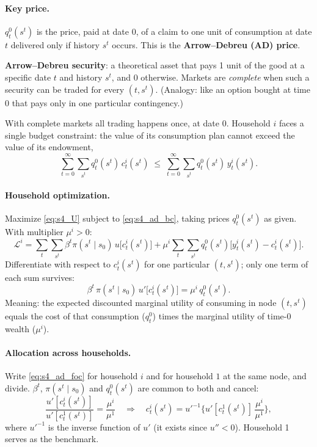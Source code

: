 \paragraph{Key price.} $q^0_t(s^t)$ is the price, paid at date $0$, of a claim to one unit of consumption at date $t$ delivered only if history $s^t$ occurs. This is the \textbf{Arrow--Debreu (AD) price}.

\textbf{Arrow--Debreu security}: a theoretical asset that pays 1 unit of the good at a specific date $t$ and history $s^t$, and 0 otherwise. Markets are \emph{complete} when such a security can be traded for every $(t,s^t)$. (Analogy: like an option bought at time 0 that pays only in one particular contingency.)

With complete markets all trading happens once, at date $0$. Household $i$ faces a single budget constraint: the value of its consumption plan cannot exceed the value of its endowment,
\begin{equation}\label{eq:s4_ad_bc}
  \sum_{t=0}^{\infty}\sum_{s^t} q^0_t(s^t)\,c^i_t(s^t) \;\le\; \sum_{t=0}^{\infty}\sum_{s^t} q^0_t(s^t)\,y^i_t(s^t).
\end{equation}

\paragraph{Household optimization.} Maximize \eqref{eq:s4_U} subject to \eqref{eq:s4_ad_bc}, taking prices $q^0_t(s^t)$ as given. With multiplier $\mu^i>0$:
\[
\mathcal L^i = \sum_{t}\sum_{s^t}\beta^t\pi(s^t\mid s_0)\,u\big[c^i_t(s^t)\big]
 + \mu^i\sum_{t}\sum_{s^t}q^0_t(s^t)\big[y^i_t(s^t)-c^i_t(s^t)\big].
\]
Differentiate with respect to $c^i_t(s^t)$ for one particular $(t,s^t)$; only one term of each sum survives:
\begin{equation}\label{eq:s4_ad_foc}
  \beta^t\,\pi(s^t\mid s_0)\,u'\big[c^i_t(s^t)\big] = \mu^i\, q^0_t(s^t).
\end{equation}
Meaning: the expected discounted marginal utility of consuming in node $(t,s^t)$ equals the cost of that consumption ($q^0_t$) times the marginal utility of time-0 wealth ($\mu^i$).

\paragraph{Allocation across households.}
Write \eqref{eq:s4_ad_foc} for household $i$ and for household $1$ at the same node, and divide. $\beta^t$, $\pi(s^t\mid s_0)$ and $q^0_t(s^t)$ are common to both and cancel:
\begin{equation}\label{eq:s4_ratio}
  \frac{u'[c^i_t(s^t)]}{u'[c^1_t(s^t)]} = \frac{\mu^i}{\mu^1}
  \quad\Longrightarrow\quad
  c^i_t(s^t) = u'^{-1}\Big\{u'[c^1_t(s^t)]\,\frac{\mu^i}{\mu^1}\Big\},
\end{equation}
where $u'^{-1}$ is the inverse function of $u'$ (it exists since $u''<0$). Household 1 serves as the benchmark.

